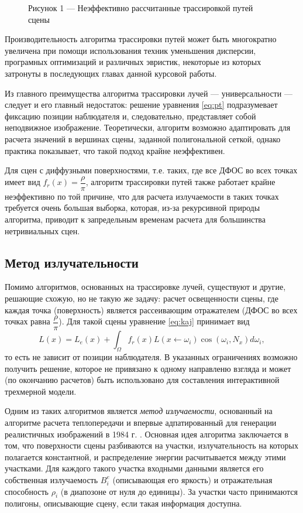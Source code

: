 \documentclass[12pt]{article}
\begin{document}
\begin{figure}[h]
\caption*{Рисунок 1 --- Неэффективно рассчитанные трассировкой путей сцены}
\end{figure}

Производительность алгоритма трассировки путей может быть многократно увеличена при помощи использования техник уменьшения дисперсии, програмных оптимизаций и различных эвристик, некоторые из которых затронуты в последующих главах данной курсовой работы.

Из главного преимущества алгоритма трассировки лучей --- универсальности --- следует и его главный недостаток: решение уравнения \eqref{eq:pt} подразумевает фиксацию позиции наблюдателя и, следовательно, представляет собой неподвижное изображение. Теоретически, алгоритм возможно адаптировать для расчета значений в вершинах сцены, заданной полигональной сеткой, однако практика показывает, что такой подход крайне неэффективен.

Для сцен с диффузными поверхностями, т.е. таких, где все ДФОС во всех точках имеет вид $f_r(x) = \dfrac{\rho}{\pi}$, алгоритм трассировки путей также работает крайне неэффективно по той причине, что для расчета излучаемости в таких точках требуется очень большая выборка, которая, из-за рекурсивной природы алгоритма, приводит к запредельным временам расчета для большинства нетривиальных сцен.
\subsection{Метод излучательности}
Помимо алгоритмов, основанных на трассировке лучей, существуют и другие, решающие схожую, но не такую же задачу: расчет освещенности сцены, где каждая точка (поверхность) является рассеивающим отражателем (ДФОС во всех точках равна $\dfrac{\rho}{\pi}$). Для такой сцены уравнение \eqref{eq:kaj} принимает вид
\begin{equation}
L(x) = L_e(x) + \int_{\Omega} f_r(x) L(x \leftarrow \omega_i) \cos(\omega_i, N_x) d \omega_i, \label{eq:diff-kaj}
\end{equation}
то есть не зависит от позиции наблюдателя. В указанных ограничениях возможно получить решение, которое не привязано к одному направленю взгляда и может (по окончанию расчетов) быть использовано для составления интерактивной трехмерной модели.

Одним из таких алгоритмов является \emph{метод излучаемости}, основанный на алгоритме расчета теплопередачи и впервые адпатированный для генерации реалистичных изображений в 1984 г. \cite{Gor84}. Основная идея алгоритма заключается в том, что поверхности сцены разбиваются на участки, излучательность на которых полагается константной, и распределение энергии расчитывается между этими участками. Для каждого такого участка входными данными является его собственная излучаемость $B_i^e$ (описывающая его яркость) и отражательная способность $\rho_i$ (в диапозоне от нуля до единицы). За участки часто принимаются полигоны, описывающие сцену, если такая информация доступна.
\end{document}
